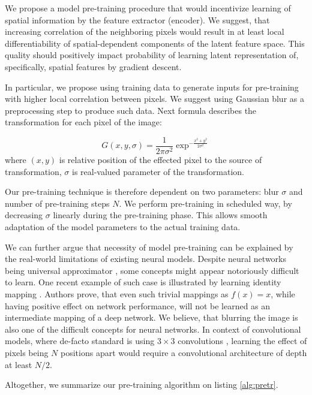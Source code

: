 We propose a model pre-training procedure that would incentivize learning of spatial information by the feature extractor (encoder).
We suggest, that increasing correlation of the neighboring pixels would result in at least local differentiability of spatial-dependent components of the latent feature space.
This quality should positively impact probability of learning latent representation of, specifically, spatial features by gradient descent.

In particular, we propose using training data to generate inputs for pre-training with higher local correlation between pixels.
We suggest using Gaussian blur as a preprocessing step to produce such data.
Next formula describes the transformation for each pixel of the image:

\begin{equation}
  G(x, y, \sigma) = \frac{1}{2\pi\sigma^2}\exp^{-\frac{x^2+y^2}{2\sigma^2}}
\end{equation}
where $(x, y)$ is relative position of the effected pixel to the source of transformation, $\sigma$ is real-valued parameter of the transformation.

Our pre-training technique is therefore dependent on two parameters: blur $\sigma$ and number of pre-training steps $N$.
We perform pre-training in scheduled way, by decreasing $\sigma$ linearly during the pre-training phase.
This allows smooth adaptation of the model parameters to the actual training data.

We can further argue that necessity of model pre-training can be explained by the real-world limitations of existing neural models.
Despite neural networks being universal approximator \cite{Debao1993}, some concepts might appear notoriously difficult to learn.
One recent example of such case is illustrated by learning identity mapping \cite{He2015}.
Authors prove, that even such trivial mappings as $f(x)=x$, while having positive effect on network performance, will not be learned as an intermediate mapping of a deep network.
We believe, that blurring the image is also one of the difficult concepts for neural networks.
In context of convolutional models, where de-facto standard is using $3 \times 3$ convolutions \cite{Szegedy2016a}, learning the effect of pixels being $N$ positions apart would require a convolutional architecture of depth at least $N/2$.

Altogether, we summarize our pre-training algorithm on listing \ref{alg:pretr}.



